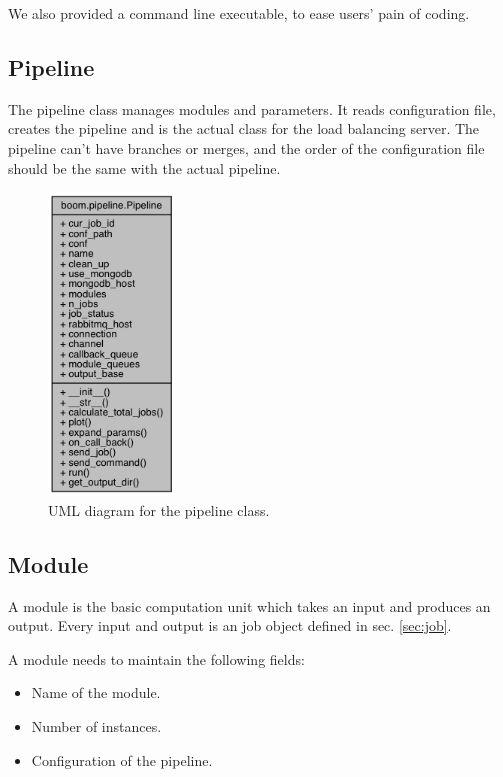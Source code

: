 \documentclass{article}
\begin{document}
    We also provided a command line executable, to ease users' pain of coding.


    \subsection{Pipeline}
    The pipeline class manages modules and parameters.
    It reads configuration file, creates the pipeline and is the actual class for the load balancing server.
    The pipeline can't have branches or merges, and the order of the configuration file should be the same with the actual pipeline.

    \begin{figure}[h]
        \begin{center}
            \includegraphics[width=0.3\textwidth]{fig/pipeline_uml.png}
        \end{center}
        \label{fig:pipeline_uml}
        \caption{UML diagram for the pipeline class.}
    \end{figure}

    \subsection{Module}
    A module is the basic computation unit which takes an input and produces an output.
    Every input and output is an job object defined in sec. \ref{sec:job}.

    A module needs to maintain the following fields:
    \begin{itemize}
        \item Name of the module.
        \item Number of instances.
        \item Configuration of the pipeline.
    \end{itemize}
        
\end{document}
